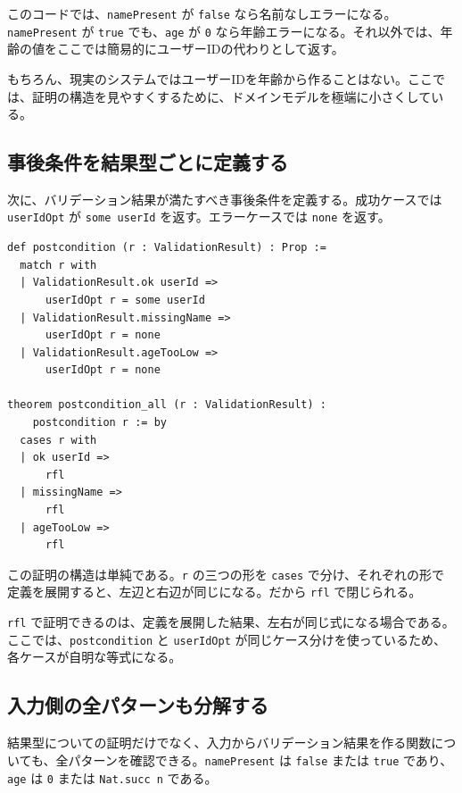 このコードでは、\texttt{namePresent} が \texttt{false} なら名前なしエラーになる。\texttt{namePresent} が \texttt{true} でも、\texttt{age} が \texttt{0} なら年齢エラーになる。それ以外では、年齢の値をここでは簡易的にユーザーIDの代わりとして返す。

もちろん、現実のシステムではユーザーIDを年齢から作ることはない。ここでは、証明の構造を見やすくするために、ドメインモデルを極端に小さくしている。

\subsection{事後条件を結果型ごとに定義する}

次に、バリデーション結果が満たすべき事後条件を定義する。成功ケースでは \texttt{userIdOpt} が \texttt{some userId} を返す。エラーケースでは \texttt{none} を返す。

\begin{listing}[htbp]
\begin{verbatim}
def postcondition (r : ValidationResult) : Prop :=
  match r with
  | ValidationResult.ok userId =>
      userIdOpt r = some userId
  | ValidationResult.missingName =>
      userIdOpt r = none
  | ValidationResult.ageTooLow =>
      userIdOpt r = none

theorem postcondition_all (r : ValidationResult) :
    postcondition r := by
  cases r with
  | ok userId =>
      rfl
  | missingName =>
      rfl
  | ageTooLow =>
      rfl
\end{verbatim}
\caption{結果型ごとの事後条件}
\label{lst:ch13-postcondition}
\end{listing}

この証明の構造は単純である。\texttt{r} の三つの形を \texttt{cases} で分け、それぞれの形で定義を展開すると、左辺と右辺が同じになる。だから \texttt{rfl} で閉じられる。

\begin{leanbox}
\texttt{rfl} で証明できるのは、定義を展開した結果、左右が同じ式になる場合である。ここでは、\texttt{postcondition} と \texttt{userIdOpt} が同じケース分けを使っているため、各ケースが自明な等式になる。
\end{leanbox}

\subsection{入力側の全パターンも分解する}

結果型についての証明だけでなく、入力からバリデーション結果を作る関数についても、全パターンを確認できる。\texttt{namePresent} は \texttt{false} または \texttt{true} であり、\texttt{age} は \texttt{0} または \texttt{Nat.succ n} である。

